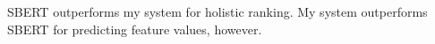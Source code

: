 SBERT outperforms my system for holistic ranking. My system outperforms SBERT for predicting feature values, however.



%
%
















